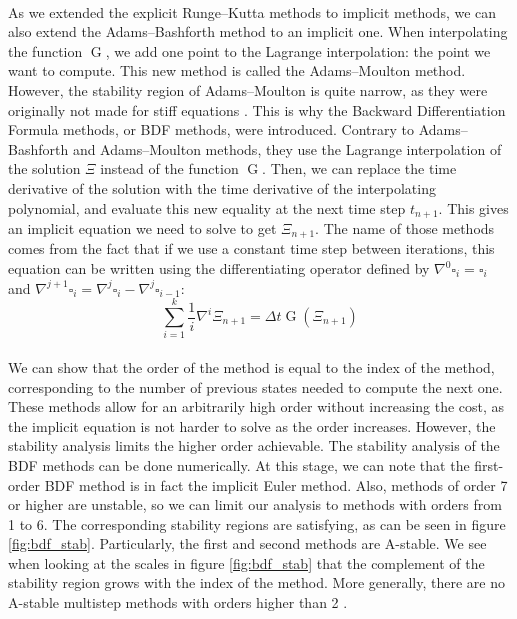         \paragraph{}
        As we extended the explicit Runge--Kutta methods to implicit methods, we can also extend the Adams--Bashforth method to an implicit one.
        When interpolating the function $\operatorname{G}$, we add one point to the Lagrange interpolation: the point we want to compute.
        This new method is called the Adams--Moulton method.
        However, the stability region of Adams--Moulton is quite narrow, as they were originally not made for stiff equations \cite{Iserles2008}.
        This is why the Backward Differentiation Formula methods, or BDF methods, were introduced.
        Contrary to Adams--Bashforth and Adams--Moulton methods, they use the Lagrange interpolation of the solution $\Xi$ instead of the function $\operatorname{G}$.
        Then, we can replace the time derivative of the solution with the time derivative of the interpolating polynomial, and evaluate this new equality at the next time step $t_{n+1}$.
        This gives an implicit equation we need to solve to get $\Xi_{n+1}$.
        The name of those methods comes from the fact that if we use a constant time step between iterations, this equation can be written using the differentiating operator defined by $\nabla^0 \square_i = \square_i$ and $\nabla^{j+1} \square_i = \nabla^j \square_i - \nabla^j \square_{i-1}$:
        \begin{equation}
          \sum_{i=1}^k \frac{1}{i} \nabla^i \Xi_{n+1} = \Delta t \operatorname{G}\left(\Xi_{n+1}\right)
        \end{equation}

        \paragraph{}
        We can show that the order of the method is equal to the index of the method, corresponding to the number of previous states needed to compute the next one.
        These methods allow for an arbitrarily high order without increasing the cost, as the implicit equation is not harder to solve as the order increases.
        However, the stability analysis limits the higher order achievable.
        The stability analysis of the BDF methods can be done numerically.
        At this stage, we can note that the first-order BDF method is in fact the implicit Euler method.
        Also, methods of order 7 or higher are unstable, so we can limit our analysis to methods with orders from 1 to 6.
        The corresponding stability regions are satisfying, as can be seen in figure \ref{fig:bdf_stab}.
        Particularly, the first and second methods are A-stable.
        We see when looking at the scales in figure \ref{fig:bdf_stab} that the complement of the stability region grows with the index of the method.
        More generally, there are no A-stable multistep methods with orders higher than 2 \cite{Dahlquist1963, HairerWanner1996}.


